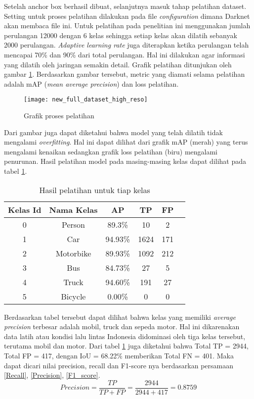 \documentclass[../thesis.tex]{subfiles}
\begin{document}
Setelah anchor box berhasil dibuat, selanjutnya masuk tahap pelatihan dataset. Setting untuk proses pelatihan dilakukan pada file \textit{configuration} dimana Darknet akan membaca file ini. Untuk pelatihan pada penelitian ini menggunakan jumlah perulangan 12000 dengan 6 kelas sehingga setiap kelas akan dilatih sebanyak 2000 perulangan. 
\textit{Adaptive learning rate} juga diterapkan ketika perulangan telah mencapai 70\% dan 90\% dari total perulangan. Hal ini dilakukan agar informasi yang dilatih oleh jaringan semakin detail. Grafik pelatihan ditunjukan oleh gambar \ref{train_darknet}. Berdasarkan gambar tersebut, metric yang diamati selama pelatihan adalah mAP (\textit{mean average precision}) dan loss pelatihan.
\begin{figure}[htp]
	\centering
	\texttt{[image: new\_full\_dataset\_high\_reso]}
	\caption{Grafik proses pelatihan}
	\label{train_darknet}
\end{figure}
Dari gambar juga dapat diketahui bahwa model yang telah dilatih tidak mengalami \textit{overfitting}. Hal ini dapat dilihat dari grafik mAP (merah) yang terus mengalami kenaikan sedangkan grafik loss pelatihan (biru) mengalami penurunan.
Hasil pelatihan model pada masing-masing kelas dapat dilihat pada tabel \ref{Tabel_training}.
\begin{table}[htp]
\centering
\begin{tabular}{ cccccc }
	\hline 
	Kelas Id & Nama Kelas & AP & TP & FP\\
	\hline
	0& Person & 89.3\% & 10 & 2\\
	1 & Car & 94.93\% & 1624 & 171\\
	2 & Motorbike& 89.93\% &1092& 212 \\
	3 & Bus & 84.73\% & 27& 5 \\
	4 & Truck & 94.60\% & 191 & 27\\
	5 & Bicycle & 0.00\% &0 & 0 \\
\end{tabular}
\caption{Hasil pelatihan untuk tiap kelas}
\label{Tabel_training}
\end{table} 
Berdasarkan tabel tersebut dapat dilihat bahwa kelas yang memiliki \textit{average precision} terbesar adalah mobil, truck dan sepeda motor. Hal ini dikarenakan data latih atau kondisi lalu lintas Indonesia didominasi oleh tiga kelas tersebut, terutama mobil dan motor. 
Dari tabel \ref{Tabel_training} juga diketahui bahwa Total TP = 2944, Total FP = 417, dengan IoU = 68.22\% memberikan Total FN = 401. Maka dapat dicari nilai precision, recall dan F1-score nya berdasarkan persamaan \ref{Recall}, \ref{Precision}, \ref{F1_score}.
\begin{equation} \label{Precision}
	Precision = \frac{TP}{TP+FP} = \frac{2944}{2944+417} = 0.8759
\end{equation}
\end{document}
